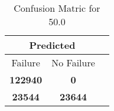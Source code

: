 \begin{table}[] 
\caption{Confusion Matric for 50.0} 
\label{Table: Prediction Accuracy-DMD50.0OnlySunEKF-combinationReflectionperfectNoFailurePrediction-Reflection} 
\centering 
\begin{tabular} 
 {@{}ccc@{}} 
\toprule 
\multicolumn{2}{c}{\textbf{Predicted}}
 \\ \midrule 
\multicolumn{1}{|c|}{Failure} & 
\multicolumn{1}{c|}{No Failure}
 \\ \midrule 
\multicolumn{1}{|c|}{\color{green}\textbf{122940}} & 
\multicolumn{1}{c|}{\color{red}\textbf{0}}
 \\ \midrule 
\multicolumn{1}{|c|}{\color{red}\textbf{23544}} & 
\multicolumn{1}{c|}{\color{green}\textbf{23644}}
 \\ \bottomrule 
\end{tabular} 
\end{table} 
